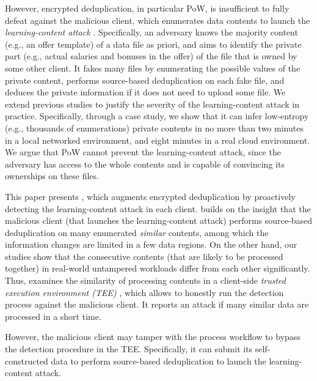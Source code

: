 However, encrypted deduplication, in particular PoW, is insufficient to fully defeat against the malicious client, which enumerates data contents to launch the {\em learning-content attack} \cite{harnik10, zuo18}. Specifically, an adversary knows the majority content (e.g., an offer template) of a data file as priori, and aims to identify the private part (e.g., actual salaries and bonuses in the offer) of the file that is owned by some other client. It fakes many files by enumerating the possible values of the private content, performs source-based deduplication on each fake file, and deduces the private information if it does not need to upload some file.
We extend previous studies \cite{harnik10, zuo18} to justify the severity of the learning-content attack in practice. Specifically, through a case study, we show that it can infer low-entropy (e.g., thousands of enumerations) private contents in no more than two minutes in a local networked environment, and eight minutes in a real cloud environment. We argue that PoW cannot prevent the learning-content attack, since the adversary has access to the whole contents and is capable of convincing its ownerships on these files.


This paper presents \sysnameF, which augments encrypted deduplication by proactively detecting the learning-content attack in each client. \sysnameF builds on the insight that the malicious client (that launches the learning-content attack) performs source-based deduplication on many enumerated {\em similar} contents, among which the information changes are limited in a few data regions.
On the other hand, our studies show that the consecutive contents (that are likely to be processed together) in real-world untampered workloads differ from each other significantly. Thus, \sysnameF examines the similarity of processing contents in a client-side {\em trusted execution environment (TEE)} \cite{sgx}, which allows to honestly run the detection process  against the malicious client. It reports an attack  if many similar data are processed in a short time.




However, the malicious client may tamper with the process workflow to bypass the detection procedure in the TEE. Specifically, it can submit its self-constructed data to perform source-based deduplication to launch the learning-content attack.

